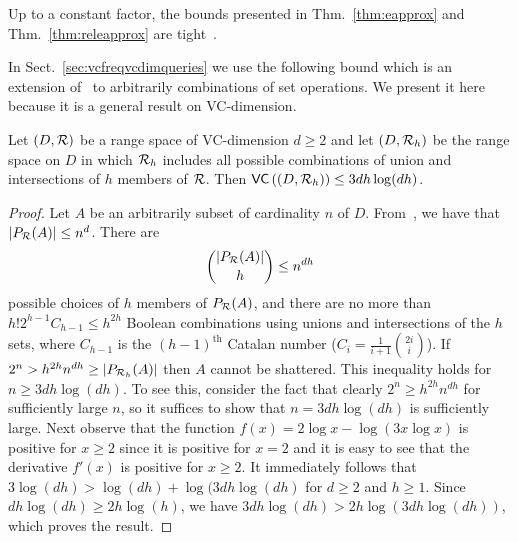 Up to a constant factor, the bounds presented in Thm.~\ref{thm:eapprox}
and Thm.~\ref{thm:releapprox} are tight~\citep[Thm.~5]{LiLS01}. 

%


In Sect.~\ref{sec:vcfreqvcdimqueries} we use the following bound
which is an extension of~\citep[Corol.~14.4.3]{AlonS08} to arbitrarily
combinations of set operations. We present it here because it is a general
result on VC-dimension.

\begin{lemma}\label{lem:genboolcomp}
   Let $(D,\mathcal{R})$ be a range space of VC-dimension $d\ge 2$ and let $(D,\mathcal{R}_h)$ be the
  range space on $D$ in which $\mathcal{R}_h$ includes all possible combinations of 
    union and intersections of $h$ members of $\mathcal{R}$. Then
    $\mathsf{VC}\left((D,\mathcal{R}_h)\right)\le 3dh\log(dh)$.
\end{lemma}

\begin{proof}
  Let $A$ be an arbitrarily subset of cardinality $n$ of $D$.
  From~\citep[Coroll.~14.4.2]{AlonS08}, we have that $|P_{\mathcal{R}}(A)|\le n^d$. There are 
  \[
  \binom{|P_{\mathcal{R}}(A)|}{h}\le  n^{dh} \]
  possible choices of $h$ members of $P_{\mathcal{R}}(A)$, and there are no more
  than $ h! 2^{h-1} C_{h-1}\leq h^{2h}$
  Boolean combinations using unions and intersections of the $h$ sets, where
  $C_{h-1}$ is the $(h-1)^{\mathrm{th}}$ Catalan number
  ($C_i=\frac{1}{i+1}\binom{2i}{i}$). If $2^n> h^{2h}n^{dh} \geq |P_{\mathcal{R}_h}(A)|$
  then $A$ cannot be shattered. This inequality holds for $n\ge 3dh\log(dh)$. To
  see this, consider the fact that clearly $2^n\ge h^{2h}n^{dh}$ for
  sufficiently large $n$, so it suffices to show that $n=3dh\log(dh)$ is
  sufficiently large. Next observe that the function $f(x)=2\log x-\log(3x\log
  x)$ is positive for $x\ge 2$ since it is positive for $x=2$ and it is easy to
  see that the derivative $f'(x)$ is positive for $x\ge 2$. It immediately
  follows that $3\log(dh)> \log(dh)+\log(3dh\log(dh)$ for $d\ge2$ and $h\ge1$.
  Since $dh\log(dh)\ge 2h\log(h)$, we have $3dh\log(dh)> 2h\log(3dh\log(dh))$,
  which proves the result.
\end{proof}


